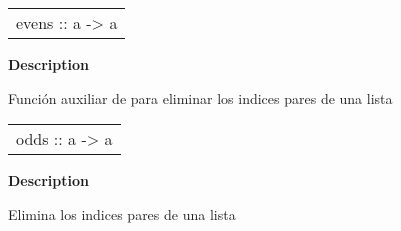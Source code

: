 \begin{haddockdesc}
\item[\begin{tabular}{@{}l}
evens :: {\char 91}a{\char 93} -> {\char 91}a{\char 93}
\end{tabular}]
{\haddockbegindoc
\textbf{Description}\par
Función auxiliar de  para eliminar los indices pares de una lista\par}
\end{haddockdesc}
\begin{haddockdesc}
\item[\begin{tabular}{@{}l}
odds :: {\char 91}a{\char 93} -> {\char 91}a{\char 93}
\end{tabular}]
{\haddockbegindoc
\textbf{Description}\par
Elimina los indices pares de una lista\par}
\end{haddockdesc}
